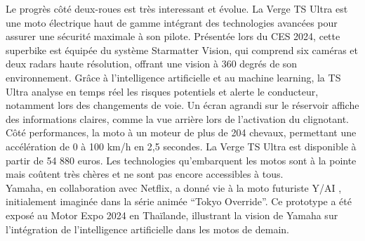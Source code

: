 Le progrès côté deux-roues est très interessant et évolue.
La Verge TS Ultra est une moto électrique \cite{lenoir_cette_2024} haut de gamme intégrant des technologies avancées pour assurer une sécurité maximale à son pilote. Présentée lors du CES 2024, cette superbike est équipée du système Starmatter Vision, qui comprend six caméras et deux radars haute résolution, offrant une vision à 360 degrés de son environnement. Grâce à l’intelligence artificielle et au machine learning, la TS Ultra analyse en temps réel les risques potentiels et alerte le conducteur, notamment lors des changements de voie. Un écran agrandi sur le réservoir affiche des informations claires, comme la vue arrière lors de l’activation du clignotant. Côté performances, la moto à un moteur de plus de 204 chevaux, permettant une accélération de 0 à 100 km/h en 2,5 secondes. La Verge TS Ultra est disponible à partir de 54 880 euros.
Les technologies qu'embarquent les motos sont à la pointe mais coûtent très chères et ne sont pas encore accessibles à tous.\\
Yamaha, en collaboration avec Netflix, a donné vie à la moto futuriste Y/AI \cite{texier_quand_2024} , initialement imaginée dans la série animée “Tokyo Override”. Ce prototype a été exposé au Motor Expo 2024 en Thaïlande, illustrant la vision de Yamaha sur l’intégration de l’intelligence artificielle dans les motos de demain.\\

